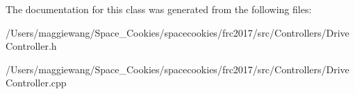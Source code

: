 The documentation for this class was generated from the following files\+:\begin{DoxyCompactItemize}
\item 
/\+Users/maggiewang/\+Space\+\_\+\+Cookies/spacecookies/frc2017/src/\+Controllers/Drive\+Controller.\+h\item 
/\+Users/maggiewang/\+Space\+\_\+\+Cookies/spacecookies/frc2017/src/\+Controllers/Drive\+Controller.\+cpp\end{DoxyCompactItemize}
